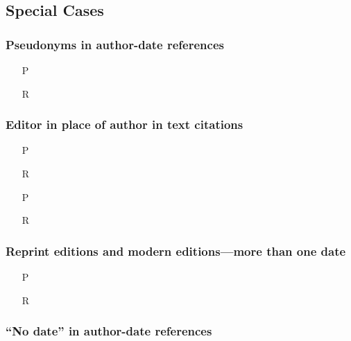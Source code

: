 \documentclass[11pt,letterpaper,oneside]{article}
\begin{document}
\setcounter{subsection}{1}
\subsection{Special Cases}
\setcounter{subsection}{15}

\setcounter{subsubsection}{33}
\subsubsection{Pseudonyms in author-date references}

\begin{itemize}
\item[P] 

\item[R] 
\end{itemize}

\subsubsection{Editor in place of author in text citations}

\begin{itemize}
\item[P] 

\item[R] 

\item[P] 

\item[R] 
\end{itemize}

\setcounter{subsubsection}{37}
\subsubsection{Reprint editions and modern editions---more than one
date}

\begin{itemize}
\item[P] 

\item[R] 
\end{itemize}

\setcounter{subsubsection}{40}
\subsubsection{``No date'' in author-date references}
\end{document}
